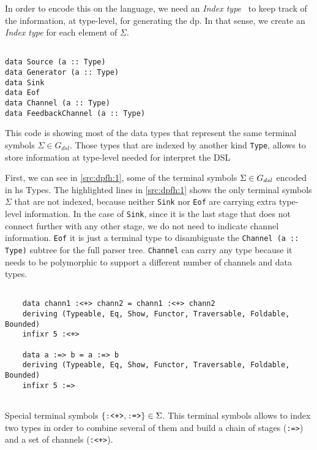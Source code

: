 In order to encode this on the language, we need an \emph{Index type}~\cite{type-index} to keep track of the information, at type-level, for generating the \acrshort{dp}. 
In that sense, we create an \emph{Index type} for each element of $\Sigma$.

\begin{listing}[htp!]
  \begin{verbatim}

data Source (a :: Type)
data Generator (a :: Type)
data Sink
data Eof
data Channel (a :: Type)
data FeedbackChannel (a :: Type)

  \end{verbatim}
  \caption[{[\texttt{Flow.hs}] $\Sigma$ enconding of $G_{dsl}$}]{This code is showing most of the data types that represent the same terminal symbols $\Sigma \in G_{dsl}$. Those types that are indexed by another kind \texttt{Type}, allows to store information at type-level needed for interpret the DSL}
  \label{src:dpfh:1}
\end{listing}
  
First, we can see in \autoref{src:dpfh:1}, some of the terminal symbols $\Sigma \in G_{dsl}$ encoded in \acrshort{hs} Types.
The highlighted lines in \autoref{src:dpfh:1} shows the only terminal symbols $\Sigma$ that are not indexed, because neither \texttt{Sink} nor \texttt{Eof} are carrying extra type-level information. 
In the case of \texttt{Sink}, since it is the last stage that does not connect further with any other stage, we do not need to indicate channel information. 
\texttt{Eof} it is just a terminal type to disambiguate the \texttt{Channel (a :: Type)} subtree for the full parser tree. 
\texttt{Channel} can carry any type because it needs to be polymorphic to support a different number of channels and data types.

\begin{listing}[htp!]
  \begin{verbatim}
    
    data chann1 :<+> chann2 = chann1 :<+> chann2
    deriving (Typeable, Eq, Show, Functor, Traversable, Foldable, Bounded)
    infixr 5 :<+>
    
    data a :=> b = a :=> b
    deriving (Typeable, Eq, Show, Functor, Traversable, Foldable, Bounded)
    infixr 5 :=>
    
  \end{verbatim}
  \caption[{[\texttt{Flow.hs}] $\Sigma$ enconding of $G_{dsl}$ - Especial non-terminals}]{Special terminal symbols $\{\text{\texttt{:<+>}}, \text{\texttt{:=>}}\} \in \Sigma$. This terminal symbols allows to index two types in order to combine several of them and build a chain of stages (\texttt{:=>}) and a set of channels (\texttt{:<+>}).}
  \label{src:dpfh:2}
\end{listing}

